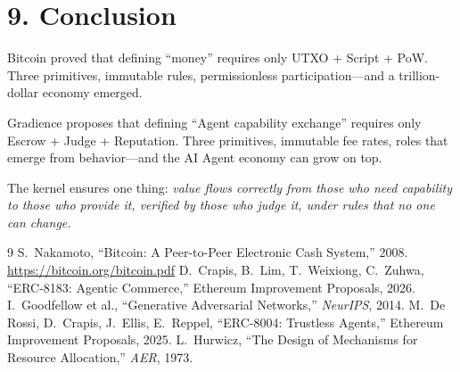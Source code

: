 \documentclass[11pt,a4paper]{article}
\begin{document}
\section{9. Conclusion}

Bitcoin proved that defining ``money'' requires only UTXO + Script + PoW. Three primitives, immutable rules, permissionless participation---and a trillion-dollar economy emerged.

Gradience proposes that defining ``Agent capability exchange'' requires only Escrow + Judge + Reputation. Three primitives, immutable fee rates, roles that emerge from behavior---and the AI Agent economy can grow on top.

The kernel ensures one thing: \emph{value flows correctly from those who need capability to those who provide it, verified by those who judge it, under rules that no one can change.}

\begin{thebibliography}{9}
 S.~Nakamoto, ``Bitcoin: A Peer-to-Peer Electronic Cash System,'' 2008. \url{https://bitcoin.org/bitcoin.pdf}
 D.~Crapis, B.~Lim, T.~Weixiong, C.~Zuhwa, ``ERC-8183: Agentic Commerce,'' Ethereum Improvement Proposals, 2026.
 I.~Goodfellow et al., ``Generative Adversarial Networks,'' \emph{NeurIPS}, 2014.
 M.~De Rossi, D.~Crapis, J.~Ellis, E.~Reppel, ``ERC-8004: Trustless Agents,'' Ethereum Improvement Proposals, 2025.
 L.~Hurwicz, ``The Design of Mechanisms for Resource Allocation,'' \emph{AER}, 1973.
\end{thebibliography}
\end{document}

